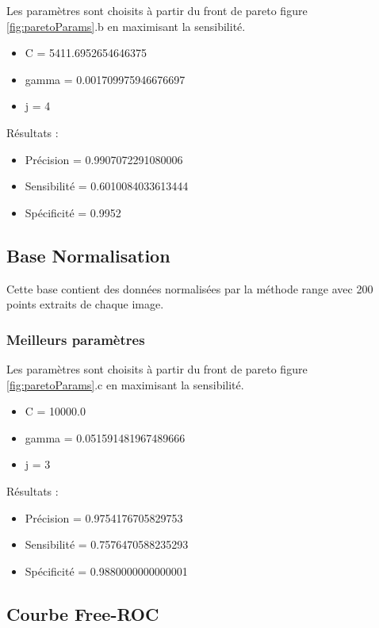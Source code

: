 Les paramètres sont choisits à partir du front de pareto figure \ref{fig:paretoParams}.b en maximisant la sensibilité.

\begin{itemize}
\item C = 5411.6952654646375	
\item gamma = 0.001709975946676697
\item j = 4
\end{itemize}

Résultats :

\begin{itemize}
\item Précision = 0.9907072291080006	
\item Sensibilité = 0.6010084033613444
\item Spécificité = 0.9952
\end{itemize}




\subsection{Base Normalisation}

Cette base contient des données normalisées par la méthode range avec 200 points extraits de chaque image.

\subsubsection{Meilleurs paramètres}

Les paramètres sont choisits à partir du front de pareto figure \ref{fig:paretoParams}.c en maximisant la sensibilité.


\begin{itemize}
\item C = 10000.0
\item gamma = 0.051591481967489666
\item j = 3
\end{itemize}

Résultats :

\begin{itemize}
\item Précision = 0.9754176705829753
\item Sensibilité = 0.7576470588235293
\item Spécificité = 0.9880000000000001
\end{itemize}

\subsection{Courbe Free-ROC}

